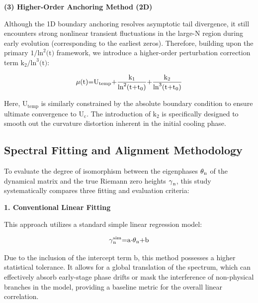 \documentclass[fractalfract,article,submit,oneauthor,pdftex]{Definitions/mdpi}
\begin{document}
\textbf{(3) Higher-Order Anchoring Method (2D)}

Although the 1D boundary anchoring resolves asymptotic tail divergence,
it still encounters strong nonlinear transient fluctuations in the
large-N region during early evolution (corresponding to the earliest
zeros). Therefore, building upon the primary
\(\text{1/}\text{ln}^{\text{2}}\text{(}\text{t}\text{)}\) framework, we
introduce a higher-order perturbation correction term
\(\text{k}_{\text{2}}\text{/}\text{ln}^{\text{3}}\text{(}\text{t}\text{)}\):

\begin{equation}
\text{\ensuremath{\mu}}\text{(}\text{t}\text{)=}\text{U}_{\text{temp}}\text{+}\frac{\text{k}_{\text{1}}}{\text{ln}^{\text{2}}\text{(}\text{t}\text{+}\text{t}_{\text{0}}\text{)}}\text{+}\frac{\text{k}_{\text{2}}}{\text{ln}^{\text{3}}\text{(}\text{t}\text{+}\text{t}_{\text{0}}\text{)}}
\end{equation}

Here, \(\text{U}_{\text{temp}}\) is similarly constrained by the
absolute boundary condition to ensure ultimate convergence to
\(\text{U}_{\text{c}}\). The introduction of \(\text{k}_{\text{2}}\) is
specifically designed to smooth out the curvature distortion inherent in
the initial cooling phase.

\subsection{Spectral Fitting and Alignment Methodology}

To evaluate the degree of isomorphism between the eigenphases
\(\text{\ensuremath{\theta}}_{\text{n}}\) of the dynamical matrix and the true Riemann
zero heights \(\text{\ensuremath{\gamma}}_{\text{n}}\), this study systematically compares
three fitting and evaluation criteria:

\textbf{1. Conventional Linear Fitting}

This approach utilizes a standard simple linear regression model:

\begin{equation}
\text{\ensuremath{\gamma}}_{\text{n}}^{\text{sim}}\text{=}\text{a}\text{\ensuremath{\cdot}}\text{\ensuremath{\theta}}_{\text{n}}\text{+}\text{b}
\end{equation}

Due to the inclusion of the intercept term \(\text{b}\), this method
possesses a higher statistical tolerance. It allows for a global
translation of the spectrum, which can effectively absorb early-stage
phase drifts or mask the interference of non-physical branches in the
model, providing a baseline metric for the overall linear correlation.
\end{document}
